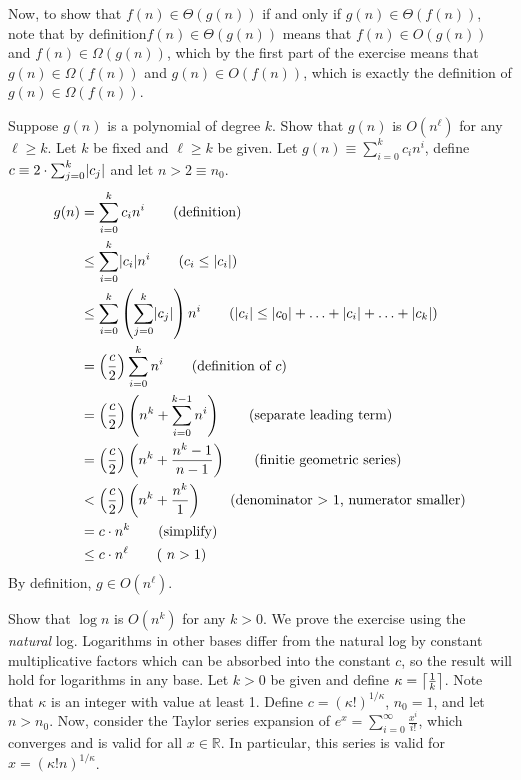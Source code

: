 Now, to show that $f(n)\in\Theta(g(n))$ if and only if $g(n)\in\Theta(f(n))$, note that by definition$f(n)\in\Theta(g(n))$ means that $f(n)\in O(g(n))$ and $f(n)\in\Omega(g(n))$, which by the first part of the exercise means that $g(n)\in \Omega(f(n))$ and $g(n)\in O(f(n))$, which is exactly the definition of $g(n)\in\Omega(f(n))$.

 Suppose $g(n)$ is a polynomial of degree $k$.  Show that $g(n)$ is $O(n^\ell)$ for any $\ell\geq k$.
\Soln Let $k$ be fixed and $\ell\geq k$ be given.  Let $g(n) \equiv \sum_{i=0}^k c_i n^i$, define $c \equiv 2\cdot\sum_{j=0}^k \abs{c_j}$ and let $n > 2 \equiv n_0$.
\begin{align*}
g(n) &= \sum_{i=0}^k c_i n^i \tag{definition} \\
 & \leq \sum_{i=0}^k \abs{c_i} n^i  \tag{$c_i \leq \abs{c_i}$}\\
 & \leq \sum_{i=0}^k \left(\sum_{j=0}^k \abs{c_j}\right) n^i \tag{$\abs{c_i} \leq \abs{c_0} + \ldots + \abs{c_i} +\ldots +\abs{c_k}$}\\
 & = \left(\frac{c}{2}\right) \sum_{i=0}^k n^i \tag{definition of $c$}\\
 &= \left(\frac{c}{2}\right)\left(n^k + \sum_{i=0}^{k-1}n^i\right) \tag{separate leading term}\\
 &= \left(\frac{c}{2}\right)\left(n^k + \frac{n^k-1}{n-1}\right) \tag{finitie geometric series}\\
 &< \left(\frac{c}{2}\right)\left(n^k + \frac{n^k}{1}\right) \tag{denominator > 1, numerator smaller}\\
 & = c\cdot n^k \tag{simplify} \\
 & \leq c \cdot n^\ell \tag{ $n > 1$}
\end{align*}
By definition, $g\in O(n^\ell)$.

 Show that $\log n$ is $O(n^k)$ for any $k > 0$.
\Soln We prove the exercise using the \textit{natural} log.  Logarithms in other bases differ from the natural log by constant multiplicative factors which can be absorbed into the constant $c$, so the result will hold for logarithms in any base. Let $k > 0$ be given and define $\kappa = \left\lceil\frac{1}{k}\right\rceil$.  Note that $\kappa$ is an integer with value at least 1.  Define $c = (\kappa!)^{1/\kappa}$, $n_0 = 1$, and let $n > n_0$.  Now, consider the Taylor series expansion of $\displaystyle e^x=\sum_{i=0}^{\infty} \frac{x^i}{i!}$, which converges and is valid for all $x\in \mathbb{R}$.  In particular, this series is valid for $x = (\kappa! n)^{1/\kappa}$.

